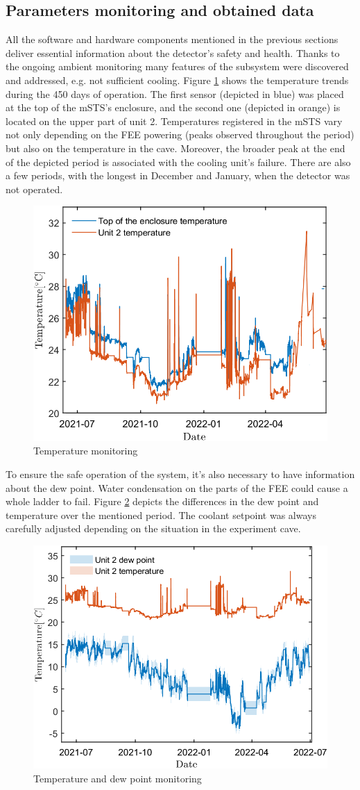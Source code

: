 \subsection{Parameters monitoring and obtained data}
All the software and hardware components mentioned in the previous sections deliver essential information about the detector's safety and health. Thanks to the ongoing ambient monitoring many features of the subsystem were discovered and addressed, e.g. not sufficient cooling. Figure \ref{fig_temp} shows the temperature trends during the 450 days of operation. The first sensor (depicted in blue) was placed at the top of the \gls{mSTS}'s enclosure, and the second one (depicted in orange) is located on the upper part of unit 2. Temperatures registered in the \gls{mSTS} vary not only depending on the \gls{FEE} powering (peaks observed throughout the period) but also on the temperature in the cave. Moreover, the broader peak at the end of the depicted period is associated with the cooling unit's failure.  There are also a few periods, with the longest in December and January, when the detector was not operated. 

\begin{figure}[!h]
\centering
\includegraphics[width=0.55\columnwidth]{Chapter6/DCS/images/temp2.png}
\caption{Temperature monitoring}
\label{fig_temp}
\end{figure}

To ensure the safe operation of the system, it's also necessary to have information about the dew point. Water condensation on the parts of the \gls{FEE} could cause a whole ladder to fail. Figure \ref{fig_dew} depicts the differences in the dew point and temperature over the mentioned period. The coolant setpoint was always carefully adjusted depending on the situation in the experiment cave. 
\newpage
\begin{figure}[!h]
\centering
\includegraphics[width=0.55\columnwidth]{Chapter6/DCS/images/dew.png}
\caption{Temperature and dew point monitoring}
\label{fig_dew}
\end{figure}


